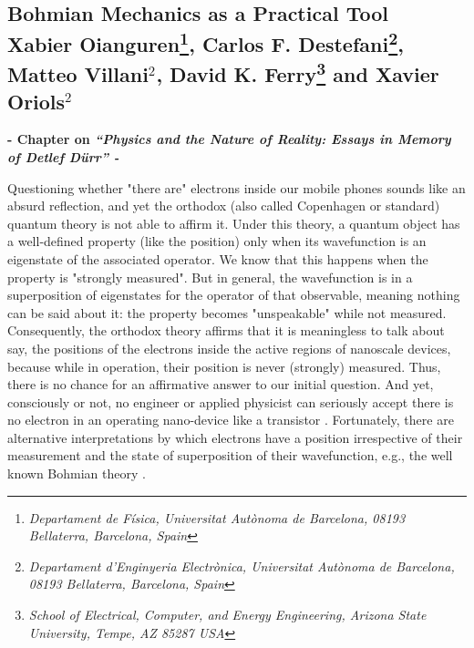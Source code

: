 \documentclass[11pt, a4paper]{article} %
\begin{document}
\newpage
{}
\setcounter{page}{1}
\begin{center}
\section*{ Bohmian Mechanics as a Practical Tool \vspace{0.2cm}\vspace{0.1cm}\\ \small Xabier Oianguren\footnote{\em Departament de Física, Universitat Autònoma de Barcelona, 08193 Bellaterra, Barcelona, Spain}, Carlos F. Destefani\footnote{\em Departament d’Enginyeria Electrònica, Universitat Autònoma de Barcelona, 08193 Bellaterra, Barcelona, Spain}, Matteo Villani$^2$, David K. Ferry\footnote{\em School of Electrical, Computer, and Energy Engineering, Arizona State University, Tempe,
AZ 85287 USA} and Xavier Oriols$^2$}
\vspace{-0.5cm}
{\bf \small - Chapter on {\em “Physics and the Nature of Reality: Essays in Memory of Detlef Dürr” - }}\vspace{-0.32cm}
\end{center}

\hspace*{4mm} Questioning whether "there are" electrons inside our mobile phones sounds like an absurd reflection, and yet the orthodox (also called Copenhagen or standard) quantum theory is not able to affirm it. Under this theory, a quantum object has a well-defined property (like the position) only when its wavefunction is an eigenstate of the associated operator. We know that this happens when the property is "strongly measured". But in general, the wavefunction is in a superposition of eigenstates for the operator of that observable, meaning nothing can be said about it: the property becomes "unspeakable" while not measured. Consequently, the orthodox theory affirms that it is meaningless to talk about say, the positions of the electrons inside the active regions of nanoscale devices, because while in operation, their position is never (strongly) measured. Thus, there is no chance for an affirmative answer to our initial question. And yet, consciously or not, no engineer or applied physicist can seriously accept there is no electron in an operating nano-device like a transistor \cite{where}. Fortunately, there are alternative interpretations by which electrons have a position irrespective of their measurement and the state of superposition of their wavefunction, e.g., the well known Bohmian theory \cite{Bohm,Holland, Durr,JordiXavier}. \vspace{-0.07cm} 
\end{document}
